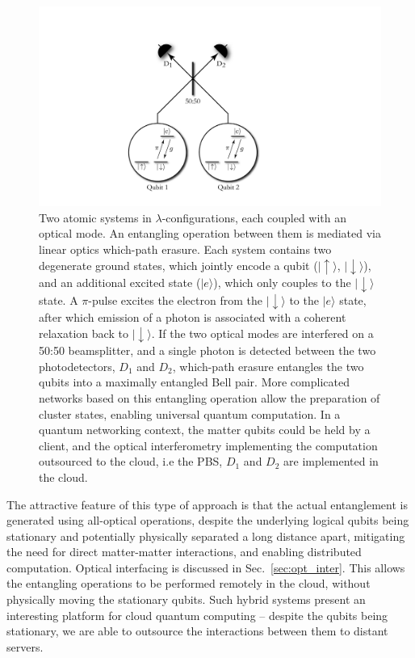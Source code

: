 \documentclass[aps,rmp,twocolumn,amsmath,amssymb,nofootinbib,superscriptaddress]{revtex4}
\newcommand{\ket}[1]{|#1\rangle}
\begin{document}
\begin{figure}[!htb]
\includegraphics[width=0.75\columnwidth]{barrett_kok}
\caption{Two atomic systems in $\lambda$-configurations, each coupled with an optical mode. An entangling operation between them is mediated via linear optics which-path erasure. Each system contains two degenerate ground states, which jointly encode a qubit ($\ket{\!\uparrow}$, $\ket{\!\downarrow}$), and an additional excited state ($\ket{e}$), which only couples to the $\ket{\!\downarrow}$ state. A $\pi$-pulse excites the electron from the $\ket{\!\downarrow}$ to the $\ket{e}$ state, after which emission of a photon is associated with a coherent relaxation back to $\ket{\!\downarrow}$. If the two optical modes are interfered on a 50:50 beamsplitter, and a single photon is detected between the two photodetectors, $D_1$ and $D_2$, which-path erasure entangles the two qubits into a maximally entangled Bell pair. More complicated networks based on this entangling operation allow the preparation of cluster states, enabling universal quantum computation. In a quantum networking context, the matter qubits could be held by a client, and the optical interferometry implementing the computation outsourced to the cloud, i.e the PBS, $D_1$ and $D_2$ are implemented in the cloud.} \label{fig:barrett_kok}
\end{figure}

The attractive feature of this type of approach is that the actual entanglement is generated using all-optical operations, despite the underlying logical qubits being stationary and potentially physically separated a long distance apart, mitigating the need for direct matter-matter interactions, and enabling distributed computation. Optical interfacing is discussed in Sec.~\ref{sec:opt_inter}. This allows the entangling operations to be performed remotely in the cloud, without physically moving the stationary qubits. Such hybrid systems present an interesting platform for cloud quantum computing -- despite the qubits being stationary, we are able to outsource the interactions between them to distant servers.
\end{document}
